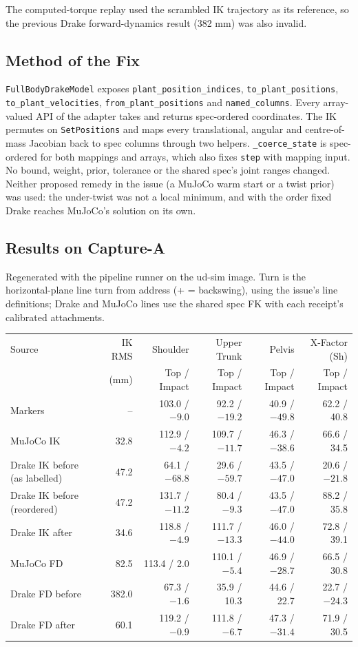 \documentclass[11pt,a4paper]{article}
\begin{document}
The computed-torque replay used the scrambled IK trajectory as its reference,
so the previous Drake forward-dynamics result (382 mm) was also invalid.

\subsection{Method of the Fix}
\texttt{FullBodyDrakeModel} exposes \texttt{plant\_position\_indices},
\texttt{to\_plant\_positions}, \texttt{to\_plant\_velocities},
\texttt{from\_plant\_positions} and \texttt{named\_columns}. Every array-valued
API of the adapter takes and returns spec-ordered coordinates. The IK permutes
on \texttt{SetPositions} and maps every translational, angular and
centre-of-mass Jacobian back to spec columns through two helpers.
\texttt{\_coerce\_state} is spec-ordered for both mappings and arrays, which
also fixes \texttt{step} with mapping input. No bound, weight, prior,
tolerance or the shared spec's joint ranges changed. Neither proposed
remedy in the issue (a MuJoCo warm start or a twist prior) was used: the
under-twist was not a local minimum, and with the order fixed Drake reaches
MuJoCo's solution on its own.

\subsection{Results on Capture-A}
Regenerated with the pipeline runner on the ud-sim image. Turn is the
horizontal-plane line turn from address (+ = backswing), using the issue's
line definitions; Drake and MuJoCo lines use the shared spec FK with each
receipt's calibrated attachments.

\begin{center}
\small
\begin{tabular}{lrrrrr}
\toprule
Source & IK RMS & Shoulder & Upper Trunk & Pelvis & X-Factor (Sh) \\
 & (mm) & Top / Impact & Top / Impact & Top / Impact & Top / Impact \\
\midrule
Markers & -- & 103.0 / $-9.0$ & 92.2 / $-19.2$ & 40.9 / $-49.8$ & 62.2 / 40.8 \\
MuJoCo IK & 32.8 & 112.9 / $-4.2$ & 109.7 / $-11.7$ & 46.3 / $-38.6$ & 66.6 / 34.5 \\
Drake IK before (as labelled) & 47.2 & 64.1 / $-68.8$ & 29.6 / $-59.7$ & 43.5 / $-47.0$ & 20.6 / $-21.8$ \\
Drake IK before (reordered) & 47.2 & 131.7 / $-11.2$ & 80.4 / $-9.3$ & 43.5 / $-47.0$ & 88.2 / 35.8 \\
Drake IK after & 34.6 & 118.8 / $-4.9$ & 111.7 / $-13.3$ & 46.0 / $-44.0$ & 72.8 / 39.1 \\
MuJoCo FD & 82.5 & 113.4 / 2.0 & 110.1 / $-5.4$ & 46.9 / $-28.7$ & 66.5 / 30.8 \\
Drake FD before & 382.0 & 67.3 / $-1.6$ & 35.9 / 10.3 & 44.6 / 22.7 & 22.7 / $-24.3$ \\
Drake FD after & 60.1 & 119.2 / $-0.9$ & 111.8 / $-6.7$ & 47.3 / $-31.4$ & 71.9 / 30.5 \\
\bottomrule
\end{tabular}
\end{center}
\end{document}
